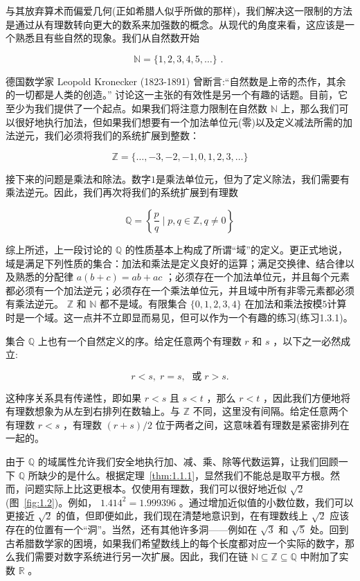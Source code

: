 与其放弃算术而偏爱几何(正如希腊人似乎所做的那样)，我们解决这一限制的方法是通过从有理数转向更大的数系来加强数的概念。从现代的角度来看，这应该是一个熟悉且有些自然的现象。我们从自然数开始

\[
\mathbb{N} = \{ 1,2,3,4,5,\ldots \} \text{ . }
\]

德国数学家 Leopold Kronecker (1823-1891) 曾断言:“自然数是上帝的杰作，其余的一切都是人类的创造。” 讨论这一主张的有效性是另一个有趣的话题。目前，它至少为我们提供了一个起点。如果我们将注意力限制在自然数 \(\mathbb{N}\) 上，那么我们可以很好地执行加法，但如果我们想要有一个加法单位元(零)以及定义减法所需的加法逆元，我们必须将我们的系统扩展到整数：

\[
\mathbb{Z} = \{ \ldots , - 3, - 2, - 1,0,1,2,3,\ldots \}
\]



接下来的问题是乘法和除法。数字$1$是乘法单位元，但为了定义除法，我们需要有乘法逆元。因此，我们再次将我们的系统扩展到有理数

\[
\mathbb{Q} = \left\{ \frac{p}{q}\mid p,q\in \mathbb{Z}, q\ne 0 \right\}
\]

综上所述，上一段讨论的 \(\mathbb{Q}\) 的性质基本上构成了所谓“域”的定义。更正式地说，域是满足下列性质的集合：加法和乘法是定义良好的运算；满足交换律、结合律以及熟悉的分配律 \(a\left( {b + c}\right)  = {ab} + {ac}\) ；必须存在一个加法单位元，并且每个元素都必须有一个加法逆元；必须存在一个乘法单位元，并且域中所有非零元素都必须有乘法逆元。 \(\mathbb{Z}\) 和 \(\mathbb{N}\) 都不是域。有限集合 \(\{ 0,1,2,3,4\}\) 在加法和乘法按模$5$计算时是一个域。这一点并不立即显而易见，但可以作为一个有趣的练习(练习1.3.1)。

集合 \(\mathbb{Q}\) 上也有一个自然定义的序。给定任意两个有理数 \(r\) 和 \(s\) ，以下之一必然成立:

\[
r < s,\;r = s,\;\text{ 或}\;r > s.
\]

这种序关系具有传递性，即如果 \(r < s\) 且 \(s < t\) ，那么 \(r < t\) ，因此我们方便地将有理数想象为从左到右排列在数轴上。与 \(\mathbb{Z}\) 不同，这里没有间隔。给定任意两个有理数 \(r < s\) ，有理数 \(\left( {r + s}\right) /2\) 位于两者之间，这意味着有理数是紧密排列在一起的。

由于 \(\mathbb{Q}\) 的域属性允许我们安全地执行加、减、乘、除等代数运算，让我们回顾一下 \(\mathbb{Q}\) 所缺少的是什么。根据定理~\ref{thm:1.1.1}，显然我们不能总是取平方根。然而，问题实际上比这更根本。仅使用有理数，我们可以很好地近似 \(\sqrt{2}\) (图~\ref{fig:1.2})。例如， \({1.414}^{2} = {1.999396}\) 。通过增加近似值的小数位数，我们可以更接近 \(\sqrt{2}\) 的值，但即便如此，我们现在清楚地意识到，在有理数线上 \(\sqrt{2}\) 应该存在的位置有一个“洞”。当然，还有其他许多洞——例如在 \(\sqrt{3}\) 和 \(\sqrt{5}\) 处。回到古希腊数学家的困境，如果我们希望数线上的每个长度都对应一个实际的数字，那么我们需要对数字系统进行另一次扩展。因此，我们在链 \(\mathbb{N} \subseteq  \mathbb{Z} \subseteq  \mathbb{Q}\) 中附加了实数 \(\mathbb{R}\) 。

